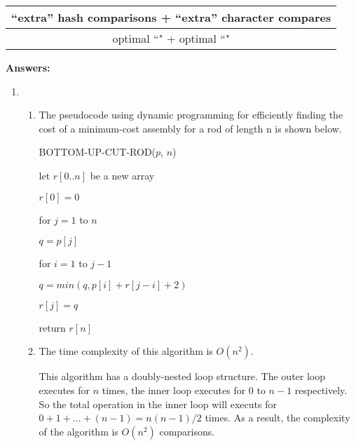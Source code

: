 \documentclass[11pt,letterpaper,oneside]{article}
\begin{document}
\begin{enumerate}
\begin{enumerate}
\begin{tabular}{c}
``extra'' hash comparisons + ``extra'' character compares\\ \hline
optimal ``\hspace{7em}" + optimal ``\hspace{7em}"\\
\end{tabular}

\end{enumerate}

\end{enumerate}


\noindent\textbf{Answers:}
\begin{enumerate}
\item 
\begin{enumerate}
\item The pseudocode using dynamic programming for efficiently finding the cost of a minimum-cost assembly for a rod of length n is shown below.

\vspace{1em}\hspace{2em} BOTTOM-UP-CUT-ROD($p$, $n$)

\hspace{3em}    let $r[0..n]$ be a new array

\hspace{3em}    $r[0] = 0$

\hspace{3em}    for $j = 1$ to $n$
 
\hspace{4em}        $q = p[j]$

\hspace{4em}        for $i = 1$ to $j-1$
 
\hspace{5em}            $q = min(q, p[i] + r[j-i] + 2)$

\hspace{4em}        $r[j] = q$

\hspace{3em}    return $r[n]$

\null

\item The time complexity of this algorithm is $O(n^2)$.
  
This algorithm has a doubly-nested loop structure. The outer loop executes for $n$ times, the inner loop executes for $0$ to $n-1$ respectively. So the total operation in the inner loop will executs for $0 + 1 + ... + (n-1) = n(n-1)/2$ times. As a result, the complexity of the algorithm is $O(n^2)$ comparisons.


\end{enumerate}
\end{enumerate}
\end{document}
